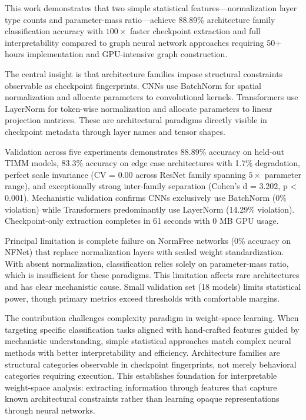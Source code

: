 
This work demonstrates that two simple statistical features---normalization layer type counts and parameter-mass ratio---achieve 88.89\% architecture family classification accuracy with $100\times$ faster checkpoint extraction and full interpretability compared to graph neural network approaches requiring 50+ hours implementation and GPU-intensive graph construction.

The central insight is that architecture families impose structural constraints observable as checkpoint fingerprints. CNNs use BatchNorm for spatial normalization and allocate parameters to convolutional kernels. Transformers use LayerNorm for token-wise normalization and allocate parameters to linear projection matrices. These are architectural paradigms directly visible in checkpoint metadata through layer names and tensor shapes.

Validation across five experiments demonstrates 88.89\% accuracy on held-out TIMM models, 83.3\% accuracy on edge case architectures with 1.7\% degradation, perfect scale invariance (CV = 0.00 across ResNet family spanning $5\times$ parameter range), and exceptionally strong inter-family separation (Cohen's d = 3.202, p < 0.001). Mechanistic validation confirms CNNs exclusively use BatchNorm (0\% violation) while Transformers predominantly use LayerNorm (14.29\% violation). Checkpoint-only extraction completes in 61 seconds with 0 MB GPU usage.

Principal limitation is complete failure on NormFree networks (0\% accuracy on NFNet) that replace normalization layers with scaled weight standardization. With absent normalization, classification relies solely on parameter-mass ratio, which is insufficient for these paradigms. This limitation affects rare architectures and has clear mechanistic cause. Small validation set (18 models) limits statistical power, though primary metrics exceed thresholds with comfortable margins.

The contribution challenges complexity paradigm in weight-space learning. When targeting specific classification tasks aligned with hand-crafted features guided by mechanistic understanding, simple statistical approaches match complex neural methods with better interpretability and efficiency. Architecture families are structural categories observable in checkpoint fingerprints, not merely behavioral categories requiring execution. This establishes foundation for interpretable weight-space analysis: extracting information through features that capture known architectural constraints rather than learning opaque representations through neural networks.
